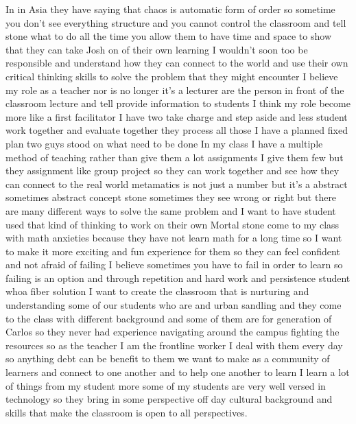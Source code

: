 \documentclass[
]{book}
\begin{document}
In in Asia they have saying that chaos is automatic form of order so sometime you don't see everything structure and you cannot control the classroom and tell stone what to do all the time you allow them to have time and space to show that they can take Josh on of their own learning I wouldn't soon too be responsible and understand how they can connect to the world and use their own critical thinking skills to solve the problem that they might encounter
I believe my role as a teacher nor is no longer it's a lecturer are the person in front of the classroom lecture and tell provide information to students I think my role become more like a first facilitator I have two take charge and step aside and less student work together and evaluate together they process all those I have a planned fixed plan two guys stood on what need to be done
In my class I have a multiple method of teaching rather than give them a lot assignments I give them few but they assignment like group project so they can work together and see how they can connect to the real world metamatics is not just a number but it's a abstract sometimes abstract concept stone sometimes they see wrong or right but there are many different ways to solve the same problem and I want to have student used that kind of thinking to work on their own
Mortal stone come to my class with math anxieties because they have not learn math for a long time so I want to make it more exciting and fun experience for them so they can feel confident and not afraid of failing I believe sometimes you have to fail in order to learn so failing is an option and through repetition and hard work and persistence student whoa fiber solution
I want to create the classroom that is nurturing and understanding some of our students who are and urban sandling and they come to the class with different background and some of them are for generation of Carlos so they never had experience navigating around the campus fighting the resources so as the teacher I am the frontline worker I deal with them every day so anything debt can be benefit to them we want to make as a community of learners and connect to one another and to help one another to learn I learn a lot of things from my student more some of my students are very well versed in technology so they bring in some perspective off day cultural background and skills that make the classroom is open to all perspectives.
\end{document}

